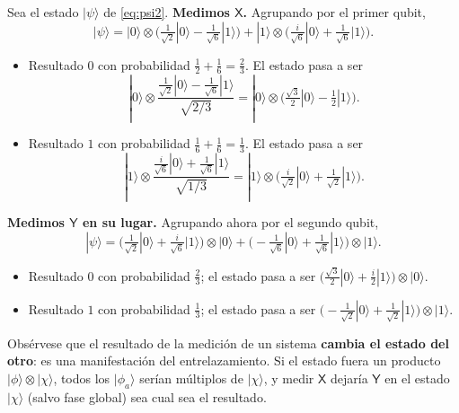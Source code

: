\documentclass[11pt, a4paper, twoside, openright]{report}
\begin{document}
\begin{tcolorbox}[colback=cyan!5!white,colframe=cyan!75!black,title=\textbf{Ejemplo: Medición parcial de dos qubits}]
Sea el estado $|\psi\rangle$ de \eqref{eq:psi2}. \textbf{Medimos $\mathsf{X}$.} Agrupando por el primer qubit,
\[ |\psi\rangle = |0\rangle\otimes\Big(\tfrac{1}{\sqrt2}|0\rangle - \tfrac{1}{\sqrt6}|1\rangle\Big) + |1\rangle\otimes\Big(\tfrac{i}{\sqrt6}|0\rangle + \tfrac{1}{\sqrt6}|1\rangle\Big). \]
\begin{itemize}
    \item Resultado $0$ con probabilidad $\frac12 + \frac16 = \frac23$. El estado pasa a ser
    \[ |0\rangle\otimes\frac{\frac{1}{\sqrt2}|0\rangle - \frac{1}{\sqrt6}|1\rangle}{\sqrt{2/3}} = |0\rangle\otimes\Big(\tfrac{\sqrt3}{2}|0\rangle - \tfrac12|1\rangle\Big). \]
    \item Resultado $1$ con probabilidad $\frac16 + \frac16 = \frac13$. El estado pasa a ser
    \[ |1\rangle\otimes\frac{\frac{i}{\sqrt6}|0\rangle + \frac{1}{\sqrt6}|1\rangle}{\sqrt{1/3}} = |1\rangle\otimes\Big(\tfrac{i}{\sqrt2}|0\rangle + \tfrac{1}{\sqrt2}|1\rangle\Big). \]
\end{itemize}
\textbf{Medimos $\mathsf{Y}$ en su lugar.} Agrupando ahora por el segundo qubit,
\[ |\psi\rangle = \Big(\tfrac{1}{\sqrt2}|0\rangle + \tfrac{i}{\sqrt6}|1\rangle\Big)\otimes|0\rangle + \Big(-\tfrac{1}{\sqrt6}|0\rangle + \tfrac{1}{\sqrt6}|1\rangle\Big)\otimes|1\rangle. \]
\begin{itemize}
    \item Resultado $0$ con probabilidad $\frac23$; el estado pasa a ser $\Big(\frac{\sqrt3}{2}|0\rangle + \frac{i}{2}|1\rangle\Big)\otimes|0\rangle$.
    \item Resultado $1$ con probabilidad $\frac13$; el estado pasa a ser $\Big(-\frac{1}{\sqrt2}|0\rangle + \frac{1}{\sqrt2}|1\rangle\Big)\otimes|1\rangle$.
\end{itemize}
Obsérvese que el resultado de la medición de un sistema \textbf{cambia el estado del otro}: es una manifestación del entrelazamiento. Si el estado fuera un producto $|\phi\rangle\otimes|\chi\rangle$, todos los $|\phi_a\rangle$ serían múltiplos de $|\chi\rangle$, y medir $\mathsf{X}$ dejaría $\mathsf{Y}$ en el estado $|\chi\rangle$ (salvo fase global) sea cual sea el resultado.
\end{tcolorbox}
\end{document}

